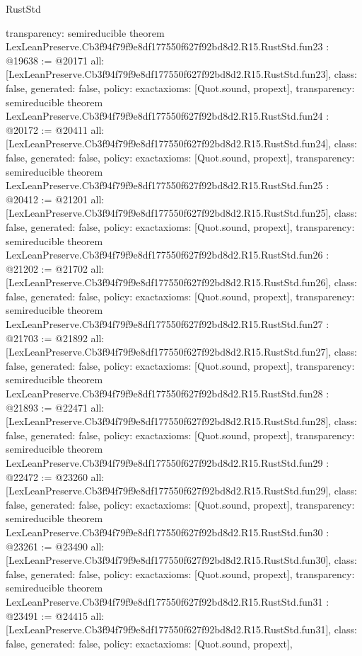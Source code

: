 \begin{lexlean}{RustStd}
\begin{coremodule}
{  transparency: semireducible
}
theorem LexLeanPreserve.Cb3f94f79f9e8df177550f627f92bd8d2.R15.RustStd.fun23 : @19638 := @20171 {
  all: [LexLeanPreserve.Cb3f94f79f9e8df177550f627f92bd8d2.R15.RustStd.fun23],
  class: false,
  generated: false,
  policy: exact{axioms: [Quot.sound, propext]},
  transparency: semireducible
}
theorem LexLeanPreserve.Cb3f94f79f9e8df177550f627f92bd8d2.R15.RustStd.fun24 : @20172 := @20411 {
  all: [LexLeanPreserve.Cb3f94f79f9e8df177550f627f92bd8d2.R15.RustStd.fun24],
  class: false,
  generated: false,
  policy: exact{axioms: [Quot.sound, propext]},
  transparency: semireducible
}
theorem LexLeanPreserve.Cb3f94f79f9e8df177550f627f92bd8d2.R15.RustStd.fun25 : @20412 := @21201 {
  all: [LexLeanPreserve.Cb3f94f79f9e8df177550f627f92bd8d2.R15.RustStd.fun25],
  class: false,
  generated: false,
  policy: exact{axioms: [Quot.sound, propext]},
  transparency: semireducible
}
theorem LexLeanPreserve.Cb3f94f79f9e8df177550f627f92bd8d2.R15.RustStd.fun26 : @21202 := @21702 {
  all: [LexLeanPreserve.Cb3f94f79f9e8df177550f627f92bd8d2.R15.RustStd.fun26],
  class: false,
  generated: false,
  policy: exact{axioms: [Quot.sound, propext]},
  transparency: semireducible
}
theorem LexLeanPreserve.Cb3f94f79f9e8df177550f627f92bd8d2.R15.RustStd.fun27 : @21703 := @21892 {
  all: [LexLeanPreserve.Cb3f94f79f9e8df177550f627f92bd8d2.R15.RustStd.fun27],
  class: false,
  generated: false,
  policy: exact{axioms: [Quot.sound, propext]},
  transparency: semireducible
}
theorem LexLeanPreserve.Cb3f94f79f9e8df177550f627f92bd8d2.R15.RustStd.fun28 : @21893 := @22471 {
  all: [LexLeanPreserve.Cb3f94f79f9e8df177550f627f92bd8d2.R15.RustStd.fun28],
  class: false,
  generated: false,
  policy: exact{axioms: [Quot.sound, propext]},
  transparency: semireducible
}
theorem LexLeanPreserve.Cb3f94f79f9e8df177550f627f92bd8d2.R15.RustStd.fun29 : @22472 := @23260 {
  all: [LexLeanPreserve.Cb3f94f79f9e8df177550f627f92bd8d2.R15.RustStd.fun29],
  class: false,
  generated: false,
  policy: exact{axioms: [Quot.sound, propext]},
  transparency: semireducible
}
theorem LexLeanPreserve.Cb3f94f79f9e8df177550f627f92bd8d2.R15.RustStd.fun30 : @23261 := @23490 {
  all: [LexLeanPreserve.Cb3f94f79f9e8df177550f627f92bd8d2.R15.RustStd.fun30],
  class: false,
  generated: false,
  policy: exact{axioms: [Quot.sound, propext]},
  transparency: semireducible
}
theorem LexLeanPreserve.Cb3f94f79f9e8df177550f627f92bd8d2.R15.RustStd.fun31 : @23491 := @24415 {
  all: [LexLeanPreserve.Cb3f94f79f9e8df177550f627f92bd8d2.R15.RustStd.fun31],
  class: false,
  generated: false,
  policy: exact{axioms: [Quot.sound, propext]},
}
\end{coremodule}
\end{lexlean}
